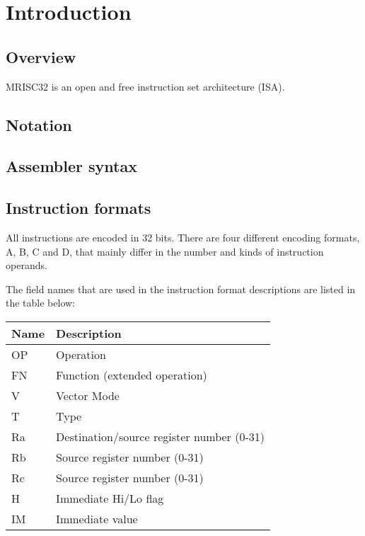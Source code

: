 %

\chapter{Introduction}

\section{Overview}

MRISC32 is an open and free instruction set architecture (ISA).

\section{Notation}

\tbd

\section{Assembler syntax}

\tbd

\section{Instruction formats}

All instructions are encoded in 32 bits. There are four different encoding
formats, A, B, C and D, that mainly differ in the number and kinds of
instruction operands.

The field names that are used in the instruction format descriptions are listed
in the table below:

\begin{tabular}{|l|l|}
  \hline
  \textbf{Name} & \textbf{Description} \\
  \hline
  OP & Operation \\
  \hline
  FN & Function (extended operation) \\
  \hline
  V  & Vector Mode \\
  \hline
  T  & Type \\
  \hline
  Ra & Destination/source register number (0-31) \\
  \hline
  Rb & Source register number (0-31) \\
  \hline
  Rc & Source register number (0-31) \\
  \hline
  H  & Immediate Hi/Lo flag \\
  \hline
  IM & Immediate value \\
  \hline
\end{tabular}

